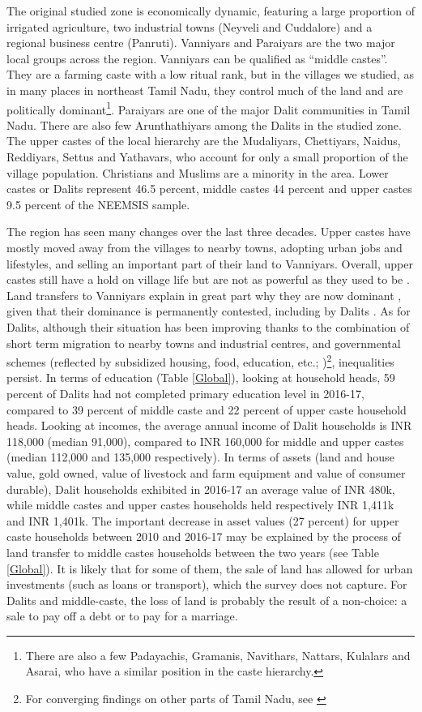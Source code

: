 \documentclass[a4paper, 11pt, onecolumn]{article}
\begin{document}
The original studied zone is economically dynamic, featuring a large proportion of irrigated agriculture, two industrial towns (Neyveli and Cuddalore) and a regional business centre (Panruti). Vanniyars and Paraiyars are the two major local groups across the region. Vanniyars can be qualified as “middle castes”. They are a farming caste with a low ritual rank, but in the villages we studied, as in many places in northeast Tamil Nadu, they control much of the land and are politically dominant\footnote{There are also a few Padayachis, Gramanis, Navithars, Nattars, Kulalars and Asarai, who have a similar position in the caste hierarchy.}. Paraiyars are one of the major Dalit communities in Tamil Nadu. There are also few Arunthathiyars among the Dalits in the studied zone. The upper castes of the local hierarchy are the Mudaliyars, Chettiyars, Naidus, Reddiyars, Settus and Yathavars, who account for only a small proportion of the village population. Christians and Muslims are a minority in the area. Lower castes or Dalits represent 46.5 percent, middle castes 44 percent and upper castes 9.5 percent of the NEEMSIS sample.

The region has seen many changes over the last three decades. Upper castes have mostly moved away from the villages to nearby towns, adopting urban jobs and lifestyles, and selling an important part of their land to Vanniyars. Overall, upper castes still have a hold on village life but are not as powerful as they used to be \citep{Harriss2013}. Land transfers to Vanniyars explain in great part why they are now dominant \citep{Harriss2016}, given that their dominance is permanently contested, including by Dalits \citep{Pandian2000}. As for Dalits, although their situation has been improving thanks to the combination of short term migration to nearby towns and industrial centres, and governmental schemes (reflected by subsidized housing, food, education, etc.; \cite{Guerin2014})\footnote{For converging findings on other parts of Tamil Nadu, see \cite{Heyer2012, Harriss2016}}, inequalities persist. In terms of education (Table \ref{Global}), looking at household heads, 59 percent of Dalits had not completed primary education level in 2016-17, compared to 39 percent of middle caste and 22 percent of upper caste household heads. Looking at incomes, the average annual income of Dalit households is INR 118,000 (median 91,000), compared to INR 160,000 for middle and upper castes (median 112,000 and 135,000 respectively). In terms of assets (land and house value, gold owned, value of livestock and farm equipment and value of consumer durable), Dalit households exhibited in 2016-17 an average value of INR 480k, while middle castes and upper castes households held respectively INR 1,411k and INR 1,401k. The important decrease in asset values (27 percent) for upper caste households between 2010 and 2016-17 may be explained by the process of land transfer to middle castes households between the two years (see Table \ref{Global}). It is likely that for some of them, the sale of land has allowed for urban investments (such as loans or transport), which the survey does not capture. 
For Dalits and middle-caste, the loss of land is probably the result of a non-choice: a sale to pay off a debt or to pay for a marriage.
\end{document}
